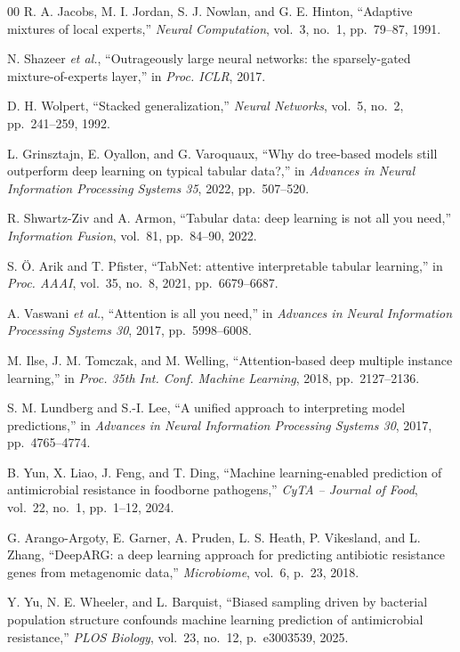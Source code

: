 \documentclass[journal]{IEEEtran}
\begin{document}
\begin{thebibliography}{00}
 R. A. Jacobs, M. I. Jordan, S. J. Nowlan, and G. E. Hinton, ``Adaptive mixtures of local experts,'' \textit{Neural Computation}, vol.~3, no.~1, pp.~79--87, 1991.

 N. Shazeer \textit{et al.}, ``Outrageously large neural networks: the sparsely-gated mixture-of-experts layer,'' in \textit{Proc. ICLR}, 2017.

 D. H. Wolpert, ``Stacked generalization,'' \textit{Neural Networks}, vol.~5, no.~2, pp.~241--259, 1992.

 L. Grinsztajn, E. Oyallon, and G. Varoquaux, ``Why do tree-based models still outperform deep learning on typical tabular data?,'' in \textit{Advances in Neural Information Processing Systems 35}, 2022, pp.~507--520.

 R. Shwartz-Ziv and A. Armon, ``Tabular data: deep learning is not all you need,'' \textit{Information Fusion}, vol.~81, pp.~84--90, 2022.

 S. \"{O}. Arik and T. Pfister, ``TabNet: attentive interpretable tabular learning,'' in \textit{Proc. AAAI}, vol.~35, no.~8, 2021, pp.~6679--6687.

 A. Vaswani \textit{et al.}, ``Attention is all you need,'' in \textit{Advances in Neural Information Processing Systems 30}, 2017, pp.~5998--6008.

 M. Ilse, J. M. Tomczak, and M. Welling, ``Attention-based deep multiple instance learning,'' in \textit{Proc. 35th Int. Conf. Machine Learning}, 2018, pp.~2127--2136.

 S. M. Lundberg and S.-I. Lee, ``A unified approach to interpreting model predictions,'' in \textit{Advances in Neural Information Processing Systems 30}, 2017, pp.~4765--4774.

 B. Yun, X. Liao, J. Feng, and T. Ding, ``Machine learning-enabled prediction of antimicrobial resistance in foodborne pathogens,'' \textit{CyTA -- Journal of Food}, vol.~22, no.~1, pp.~1--12, 2024.

 G. Arango-Argoty, E. Garner, A. Pruden, L. S. Heath, P. Vikesland, and L. Zhang, ``DeepARG: a deep learning approach for predicting antibiotic resistance genes from metagenomic data,'' \textit{Microbiome}, vol.~6, p.~23, 2018.

 Y. Yu, N. E. Wheeler, and L. Barquist, ``Biased sampling driven by bacterial population structure confounds machine learning prediction of antimicrobial resistance,'' \textit{PLOS Biology}, vol.~23, no.~12, p.~e3003539, 2025.


\end{thebibliography}
\end{document}
